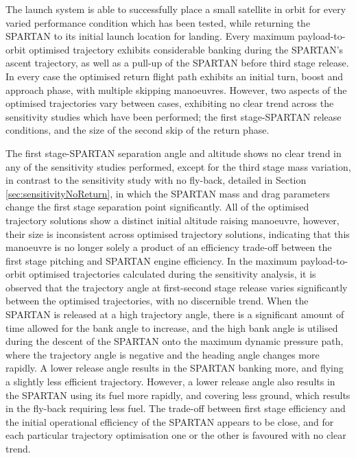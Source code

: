 The launch system is able to successfully place a small satellite in orbit for every varied performance condition which has been tested, while returning the SPARTAN to its initial launch location for landing. 
Every maximum payload-to-orbit optimised trajectory exhibits considerable banking during the SPARTAN's ascent trajectory, as well as a pull-up of the SPARTAN before third stage release. 
In every case the optimised return flight path exhibits an initial turn, boost and approach phase, with multiple skipping manoeuvres. 
However, two aspects of the optimised trajectories vary between cases, exhibiting no clear trend across the sensitivity studies which have been performed; the first stage-SPARTAN release conditions, and the size of the second skip of the return phase. 

The first stage-SPARTAN separation angle and altitude shows no clear trend in any of the sensitivity studies performed, except for the third stage mass variation, in contrast to the sensitivity study with no fly-back, detailed in Section \ref{sec:sensitivityNoReturn}, in which the SPARTAN mass and drag parameters change the first stage separation point significantly. All of the optimised trajectory solutions show a distinct initial altitude raising manoeuvre, however, their size is inconsistent across optimised trajectory solutions, indicating that this manoeuvre is no longer solely a product of an efficiency trade-off between the first stage pitching and SPARTAN engine efficiency.
In the maximum payload-to-orbit optimised trajectories calculated during the sensitivity analysis, it is observed that the trajectory angle at first-second stage release varies significantly between the optimised trajectories, with no discernible trend. When the SPARTAN is released at a high trajectory angle, there is a significant amount of time allowed for the bank angle to increase, and the high bank angle is utilised during the descent of the SPARTAN onto the maximum dynamic pressure path, where the trajectory angle is negative and the heading angle changes more rapidly. 
 A lower release angle results in the SPARTAN banking more, and flying a slightly less efficient trajectory. However, a lower release angle also results in the SPARTAN using its fuel more rapidly, and covering less ground, which results in the fly-back requiring less fuel. 
The trade-off between first stage efficiency and the initial operational efficiency of the SPARTAN appears to be close, and 
for each particular trajectory optimisation one or the other is favoured with no clear trend. 



